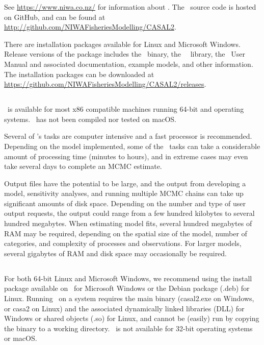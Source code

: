 See \url{https://www.niwa.co.nz/} for information about \CNAME. The \CNAME\ source code is hosted on GitHub, and can be found at \url{http://github.com/NIWAFisheriesModelling/CASAL2}.

There are installation packages available for Linux and Microsoft Windows. Release versions of the package includes the \CNAME\ binary, the \CNAME\ \R\ library, the \CNAME\ User Manual and associated documentation, example models, and other information. The installation packages can be downloaded at \url{https://github.com/NIWAFisheriesModelling/CASAL2/releases}.

\subsection{}

\CNAME\ is available for most x86 compatible machines running 64-bit  and  operating systems. \CNAME\ has not been compiled nor tested on macOS.

Several of \CNAME's tasks are computer intensive and a fast processor is recommended. Depending on the model implemented, some of the \CNAME\ tasks can take a considerable amount of processing time (minutes to hours), and in extreme cases may even take several days to complete an MCMC estimate.

Output files have the potential to be large, and the output from developing a model, sensitivity analyses, and running multiple MCMC chains can take up significant amounts of disk space. Depending on the number and type of user output requests, the output could range from a few hundred kilobytes to several hundred megabytes. When estimating model fits, several hundred megabytes of RAM may be required, depending on the spatial size of the model, number of categories, and complexity of processes and observations. For larger models, several gigabytes of RAM and disk space may occasionally be required.

\subsection{}

For both 64-bit Linux and Microsoft Windows, we recommend using the install package available on \github\ for Microsoft Windows or the Debian package (.deb) for Linux. Running \CNAME\ on a system requires the main binary (casal2.exe on Windows, or casa2 on Linux) and the associated dynamically linked libraries (DLL) for Windows or shared objects (.so) for Linux, and cannot be (easily) run by copying the binary to a working directory. \CNAME\ is not available for 32-bit operating systems or macOS.


